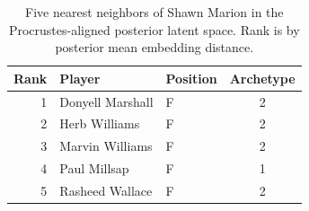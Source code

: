 \begin{table}[htbp]
  \centering\small
  \begin{tabular}{rllc}
    \toprule
    Rank & Player & Position & Archetype \\
    \midrule
    1 & Donyell Marshall & F & 2 \\
    2 & Herb Williams & F & 2 \\
    3 & Marvin Williams & F & 2 \\
    4 & Paul Millsap & F & 1 \\
    5 & Rasheed Wallace & F & 2 \\
    \bottomrule
  \end{tabular}
  \caption{Five nearest neighbors of Shawn Marion in the Procrustes-aligned posterior latent space. Rank is by posterior mean embedding distance.}
  \label{tab:Shawn_Marion_neighbors}
\end{table}

